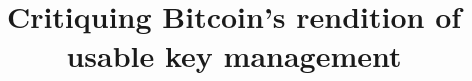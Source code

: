 \documentclass{sig-alternate}
\begin{document}
\title{Critiquing Bitcoin's rendition of usable key management}


\maketitle




















\nocite{*}


\balancecolumns
\end{document}
